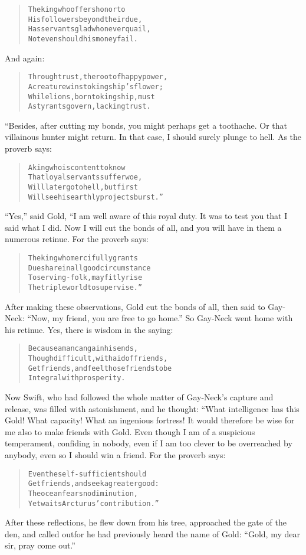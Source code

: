 \documentclass[article, twoside, 14pt]{memoir}
\renewenvironment{verbatim}{%
\begin{quote}%
\vskip -10pt%
\begin{alltt}\normalfont\large}{\end{alltt}%
\end{quote}%
\vskip -10pt
} %
\begin{document}
\begin{verbatim}
The king who offers honor to
His followers beyond their due,
Has servants glad who never quail,
Not even should his money fail.
\end{verbatim}
And again:

\begin{verbatim}
Through trust, the root of happy power,
A creature wins to kingship's flower;
While lions, born to kingship, must
As tyrants govern, lacking trust.
\end{verbatim}
“Besides, after cutting my bonds, you might perhaps get a
toothache. Or that villainous hunter might return. In that case, I
should surely plunge to hell. As the proverb says:

\begin{verbatim}
A king who is content to know
That loyal servants suffer woe,
Will later go to hell, but first
Will see his earthly projects burst.”
\end{verbatim}
``Yes,'' said Gold, “I am well aware of this royal duty. It
was to test you that I said what I did. Now I will cut the bonds of
all, and you will have in them a numerous retinue. For the proverb
says:

\begin{verbatim}
The king who mercifully grants
Due share in all good circumstance
To serving-folk, may fitly rise
The triple world to supervise.”
\end{verbatim}
After making these observations, Gold cut the bonds of all, then
said to Gay-Neck: ``Now, my friend, you are free to go home.'' So
Gay-Neck went home with his retinue. Yes, there is wisdom in the
saying:

\begin{verbatim}
Because a man can gain his ends,
Though difficult, with aid of friends,
Get friends, and feel those friends to be
Integral with prosperity.
\end{verbatim}
Now Swift, who had followed the whole matter of Gay-Neck's capture
and release, was filled with astonishment, and he thought: “What
intelligence has this Gold! What capacity! What an ingenious
fortress! It would therefore be wise for me also to make friends
with Gold. Even though I am of a suspicious temperament, confiding
in nobody, even if I am too clever to be overreached by anybody,
even so I should win a friend. For the proverb says:

\begin{verbatim}
Even the self-sufficient should
Get friends, and seek a greater good:
The ocean fears no diminution,
Yet waits Arcturus' contribution.”
\end{verbatim}
After these reflections, he flew down from his tree, approached the
gate of the den, and called out{\textemdash}for he had previously heard the
name of Gold: ``Gold, my dear sir, pray come out.''
\end{document}
